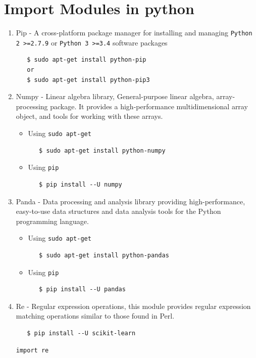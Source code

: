 \documentclass{article}
\begin{document}
\section{Import Modules in python}
\begin{enumerate}
\item Pip - A cross-platform package manager for installing and managing \verb+Python 2 >=2.7.9+ or \verb+Python 3 >=3.4+ software packages 
\scriptsize 
\begin{verbatim}
   $ sudo apt-get install python-pip
   or
   $ sudo apt-get install python-pip3
\end{verbatim}
\normalsize
\item Numpy - Linear algebra library, General-purpose linear algebra, array-processing package. It provides a high-performance multidimensional array object, and tools for working with these arrays.
\begin{itemize}
\item Using \verb+sudo apt-get+
\scriptsize 
  \begin{verbatim}
   $ sudo apt-get install python-numpy
  \end{verbatim}
\normalsize
\item Using \verb+pip+ 
\scriptsize 
  \begin{verbatim}
   $ pip install --U numpy
  \end{verbatim}
\normalsize
  \end{itemize}
\item Panda - Data processing and analysis library providing high-performance, easy-to-use data structures and data analysis tools for the Python programming language.
    \begin{itemize}
\item Using \verb+sudo apt-get+
\scriptsize 
  \begin{verbatim}
   $ sudo apt-get install python-pandas
  \end{verbatim}
\normalsize
\item Using \verb+pip+ 
\scriptsize 
  \begin{verbatim}
   $ pip install --U pandas
  \end{verbatim}
\normalsize
\end{itemize}
\item Re - Regular expression operations, this module provides regular expression matching operations similar to those found in Perl.
\scriptsize 
  \begin{verbatim}
   $ pip install --U scikit-learn
  \end{verbatim}
\normalsize
\scriptsize  
\begin{verbatim}
import re


\end{verbatim}
\end{enumerate}
\end{document}
